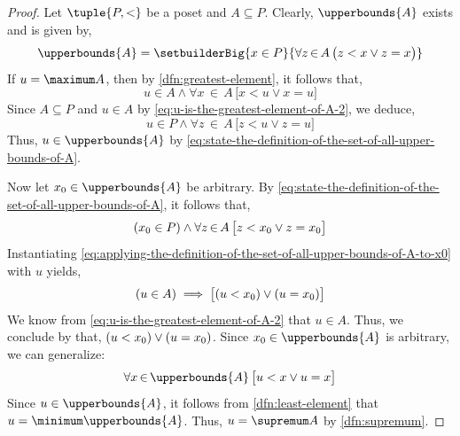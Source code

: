 \begin{proof}
    Let \( \tuple{P, <} \) be a poset and \( A \subseteq P \). Clearly, \( \upperbounds{A} \) exists and is given by,
    \begin{equation}
        \label{eq:state-the-definition-of-the-set-of-all-upper-bounds-of-A}
        \upperbounds{A} = \setbuilderBig{x \in P}{\forall z\,{\in}\,A \, \big( z < x \lor z = x \big)}
    \end{equation}
    If \( u = \maximum A \), then by \cref{dfn:greatest-element}, it follows that,
    \begin{equation}
        \label{eq:u-is-the-greatest-element-of-A-2}
        u \in A \land \forall x\,{\in}\,A \, \big[ x < u \lor x = u \big]
    \end{equation}
    Since \( A \subseteq P \) and \( u \in A \) by \eqref{eq:u-is-the-greatest-element-of-A-2}, we deduce,
    \begin{equation*}
        u \in P \land \forall z\,{\in}\,A \, \big[ z < u \lor z = u \big]
    \end{equation*}
    Thus, \( u \in \upperbounds{A} \) by \eqref{eq:state-the-definition-of-the-set-of-all-upper-bounds-of-A}.

    \vspace{0.5cm}
    \noindent
    Now let \( x_{0} \in \upperbounds{A} \) be arbitrary. By \eqref{eq:state-the-definition-of-the-set-of-all-upper-bounds-of-A},
    it follows that,
    \begin{equation}
        \label{eq:applying-the-definition-of-the-set-of-all-upper-bounds-of-A-to-x0}
        \mleft( x_{0} \in P \mright) \land \forall z\,{\in}\,A \, \big[ z < x_{0} \lor z = x_{0} \big]
    \end{equation}
    Instantiating \eqref{eq:applying-the-definition-of-the-set-of-all-upper-bounds-of-A-to-x0} with \( u \) yields,
    \begin{equation*}
        \mleft( u \in A \mright) \implies \big[ \mleft( u < x_{0} \mright) \lor \mleft( u = x_{0} \mright) \big]
    \end{equation*}
    We know from \eqref{eq:u-is-the-greatest-element-of-A-2} that \( u \in A \).
    Thus, we conclude by  that,
    \( \mleft( u < x_{0} \mright) \lor \mleft( u = x_{0} \mright)\).
    Since \( x_{0} \in \upperbounds{A} \)
    is arbitrary, we can generalize:
    \begin{equation*}
        \forall x\,{\in}\,\upperbounds{A} \, \big[ u < x \lor u = x \big]
    \end{equation*}
    Since \( u \in \upperbounds{A} \), it follows from \cref{dfn:least-element} that \( u = \minimum \upperbounds{A} \). Thus, \( u = \supremum A \)
    by \cref{dfn:supremum}.
\end{proof}


